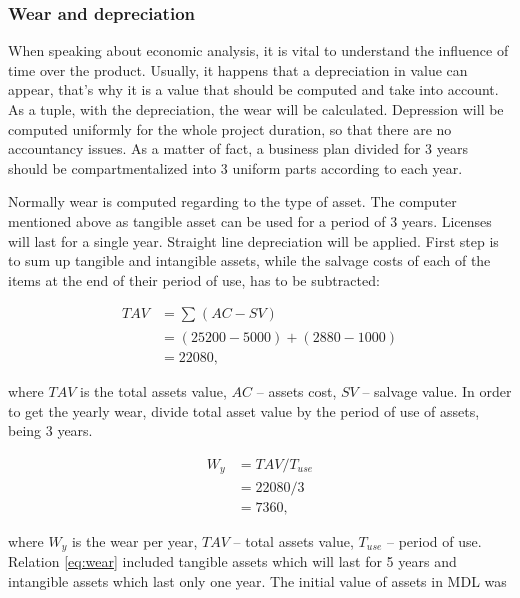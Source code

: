 \documentclass[12pt,a4paper,titlepage]{article}
\begin{document}
\subsubsection{Wear and depreciation}
When speaking about economic analysis, it is vital to understand the influence of time over the product. Usually, it happens that a depreciation in value can appear, that's why it is a value that should be computed and take into account. As a tuple, with the depreciation, the wear will be calculated. Depression will be computed uniformly for the whole project duration, so that there are no accountancy issues. As a matter of fact, a business plan divided for 3 years should be compartmentalized into 3 uniform parts according to each year.
 

Normally wear is computed regarding to the type of asset. The computer mentioned above as tangible asset  can be used for a period of 3 years. Licenses will last for a single year. Straight line depreciation will be applied. First step is to sum up tangible and intangible assets, while the salvage costs of each of the items at the end of their period of use, has to be subtracted:

\begin{equation}
 \begin{split}
  TAV &= \sum_{} (AC - SV) \\
        &= (25200 - 5000) + (2880 - 1000) \\
        &= 22080,
 \end{split}
\end{equation}

\noindent
where $TAV$ is the total assets value, $AC$ -- assets cost, $SV$ -- salvage value.
 In order to get the yearly wear, divide total asset value by the period of use of assets, being 3 years.

\begin{equation} \label{eq:wear}
 \begin{split}
  W_y &= TAV / T_{use} \\
                &= 22080/3\\
                &= 7360,
 \end{split}
\end{equation}

\noindent
where $W_y$ is the wear per year, $TAV$ -- total assets value, $T_{use}$ -- period of use. Relation \eqref{eq:wear} included tangible assets which will last for 5 years and intangible assets which last only one year. The initial value of assets in MDL was
\end{document}
